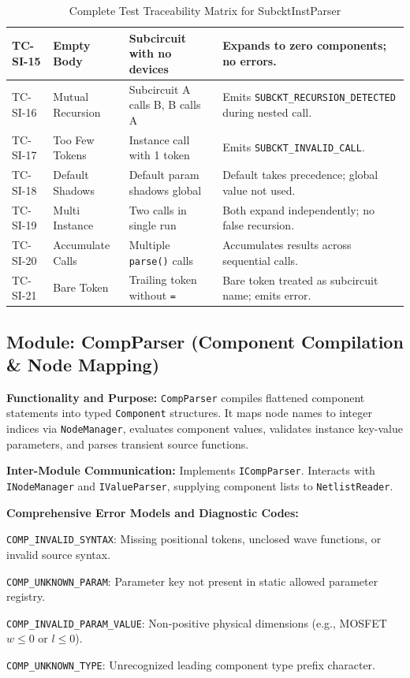 \begin{table}[H]
\begin{tabular}{|l|l|p{4.5cm}|p{4.5cm}|}
\hline
TC-SI-15 & Empty Body & Subcircuit with no devices & Expands to zero components; no errors. \\
\hline
TC-SI-16 & Mutual Recursion & Subcircuit A calls B, B calls A & Emits \texttt{SUBCKT\_RECURSION\_DETECTED} during nested call. \\
\hline
TC-SI-17 & Too Few Tokens & Instance call with 1 token & Emits \texttt{SUBCKT\_INVALID\_CALL}. \\
\hline
TC-SI-18 & Default Shadows & Default param shadows global & Default takes precedence; global value not used. \\
\hline
TC-SI-19 & Multi Instance & Two calls in single run & Both expand independently; no false recursion. \\
\hline
TC-SI-20 & Accumulate Calls & Multiple \texttt{parse()} calls & Accumulates results across sequential calls. \\
\hline
TC-SI-21 & Bare Token & Trailing token without \texttt{=} & Bare token treated as subcircuit name; emits error. \\
\hline
\end{tabular}
\caption{Complete Test Traceability Matrix for SubcktInstParser}
\end{table}


\subsection{Module: CompParser (Component Compilation \& Node Mapping)}

\textbf{Functionality and Purpose:} \texttt{CompParser} compiles flattened component statements into typed \texttt{Component} structures. It maps node names to integer indices via \texttt{NodeManager}, evaluates component values, validates instance key-value parameters, and parses transient source functions.

\textbf{Inter-Module Communication:} Implements \texttt{ICompParser}. Interacts with \texttt{INodeManager} and \texttt{IValueParser}, supplying component lists to \texttt{NetlistReader}.

\textbf{Comprehensive Error Models and Diagnostic Codes:}
\begin{compactitem}
    \item \texttt{COMP\_INVALID\_SYNTAX}: Missing positional tokens, unclosed wave functions, or invalid source syntax.
    \item \texttt{COMP\_UNKNOWN\_PARAM}: Parameter key not present in static allowed parameter registry.
    \item \texttt{COMP\_INVALID\_PARAM\_VALUE}: Non-positive physical dimensions (e.g., MOSFET $w \le 0$ or $l \le 0$).
    \item \texttt{COMP\_UNKNOWN\_TYPE}: Unrecognized leading component type prefix character.
\end{compactitem}

